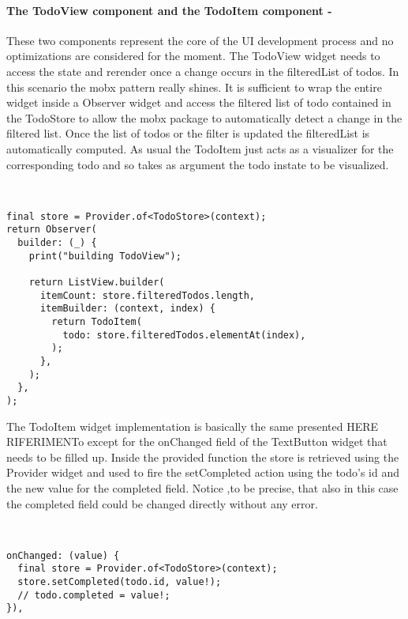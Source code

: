 \paragraph{The TodoView component and the TodoItem component - }
\label{subpar:todo_app_bloc_core_state} These two components represent the core of the UI development process and no optimizations are considered for the moment. The TodoView widget needs to access the state and rerender once a change occurs in the filteredList of todos. In this scenario the mobx pattern really shines. It is sufficient to wrap the entire widget inside a Observer widget and access the filtered list of todo contained in the TodoStore to allow the mobx package to automatically detect a change in the filtered list. Once the list of todos or the filter is updated the filteredList is automatically computed. As usual the TodoItem just acts as a visualizer for the corresponding todo and so takes as argument the todo instate to be visualized.
\begin{code}
\mbox{}\\
 \mbox{}
		\label{code:2.14}
\begin{verbatim}
final store = Provider.of<TodoStore>(context);
return Observer(
  builder: (_) {
    print("building TodoView");

    return ListView.builder(
      itemCount: store.filteredTodos.length,
      itemBuilder: (context, index) {
        return TodoItem(
          todo: store.filteredTodos.elementAt(index),
        );
      },
    );
  },
);
\end{verbatim}
\mbox{}
\end{code}

The TodoItem widget implementation is basically the same presented HERE RIFERIMENTo except for the onChanged field of the TextButton widget that needs to be filled up. Inside the provided function the store is retrieved using the Provider widget and used to fire the setCompleted action using the todo’s id and the new value for the completed field. Notice ,to be precise, that also in this case the completed field could be changed directly without any error.
\begin{code}
\mbox{}\\
 \mbox{}
		\label{code:2.14}
\begin{verbatim}
onChanged: (value) {
  final store = Provider.of<TodoStore>(context);
  store.setCompleted(todo.id, value!);
  // todo.completed = value!;
}),
\end{verbatim}
\mbox{}
\end{code}

